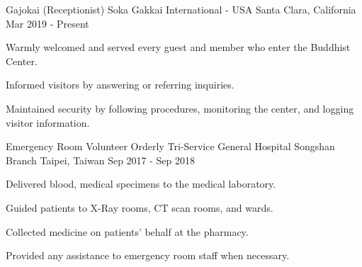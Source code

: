 

\begin{cventries}

  \cventry
    {Gajokai (Receptionist)} %
    {Soka Gakkai International - USA} %
    {Santa Clara, California} %
    {Mar 2019 - Present} %
    {
	\begin{cvitems} %
      	\item Warmly welcomed and served every guest and member who enter the Buddhist Center.
      	\item Informed visitors by answering or referring inquiries.
      	\item Maintained security by following procedures, monitoring the center, and logging visitor information.
	\end{cvitems}
    }
    
  \cventry
    {Emergency Room Volunteer Orderly} %
    {Tri-Service General Hospital Songshan Branch} %
    {Taipei, Taiwan} %
    {Sep 2017 - Sep 2018} %
    {
	\begin{cvitems} %
      	\item Delivered blood, medical specimens to the medical laboratory.
		\item Guided patients to X-Ray rooms, CT scan rooms, and wards.       
      	\item Collected medicine on patients' behalf at the pharmacy.
      	\item Provided any assistance to emergency room staff when necessary.
	\end{cvitems}
    }


\end{cventries}
